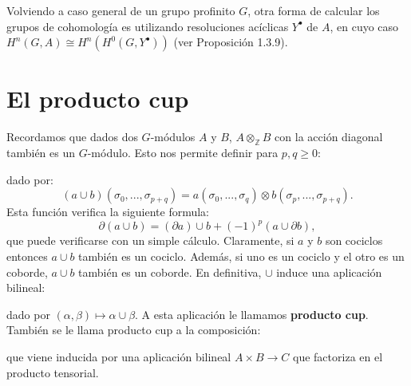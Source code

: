 \documentclass[a4paper,12pt, leqno]{article}
\begin{document}
	Volviendo a caso general de un grupo profinito $G$, otra forma de calcular los grupos de cohomología es utilizando resoluciones acíclicas $Y^{\bullet}$ de $A$, en cuyo caso $H^n(G,A)\cong H^n(H^0(G,Y^{\bullet}))$ (ver Proposición 1.3.9).
	\section{El producto cup}
	Recordamos que dados dos $G$-módulos $A$ y $B$, $A \otimes_{\mathbb{Z}} B$ con la acción diagonal también es un $G$-módulo. Esto nos permite definir para $p,q \geq 0 $:
	\begin{center}
	\end{center}
	dado por:
	\begin{equation*}
	(a\cup b)(\sigma_0,...,\sigma_{p+q})=a(\sigma_0,...,\sigma_q)\otimes b(\sigma_p,...,\sigma_{p+q}).
	\end{equation*}
	Esta función verifica la siguiente formula:
	\begin{equation*}
	\partial(a \cup b)=(\partial a) \cup b + (-1)^p (a\cup \partial b),
	\end{equation*}
	que puede verificarse con un simple cálculo. Claramente, si $a$ y $b$ son cociclos entonces $a \cup b$ también es un cociclo. Además, si uno es  un cociclo y el otro es un coborde, $a \cup b$ también es un coborde. En definitiva, $\cup$ induce una aplicación bilineal:
	\begin{center}
	\end{center}
	dado por $(\alpha, \beta) \mapsto \alpha \cup \beta$. A esta aplicación le llamamos \textbf{producto cup}. También se le llama producto cup a la composición:
	\begin{center}
	\end{center}
	que viene inducida por una aplicación bilineal $A \times B \rightarrow C$ que factoriza en el producto tensorial. 
	
\end{document}
